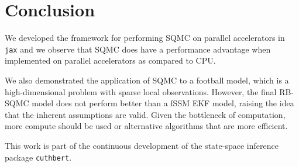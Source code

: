 \chapter{Conclusion}
We developed the framework for performing SQMC on parallel accelerators in \texttt{jax} and we observe that SQMC does have a performance advantage when implemented on parallel accelerators as compared to CPU.

We also demonstrated the application of SQMC to a football model, which is a high-dimensional problem with sparse local observations. However, the final RB-SQMC model does not perform better than a fSSM EKF model, raising the idea that the inherent assumptions are valid. Given the bottleneck of computation, more compute should be used or alternative algorithms that are more efficient. 

This work is part of the continuous development of the state-space inference package \texttt{cuthbert}.








